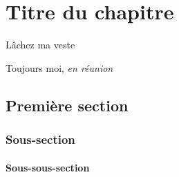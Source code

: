 \chapter{Titre du chapitre}

\epigraph{Lâchez ma veste}{Toujours moi, \textit{en réunion}}

\section{Première section}

\subsection{Sous-section}

\subsubsection{Sous-sous-section}

